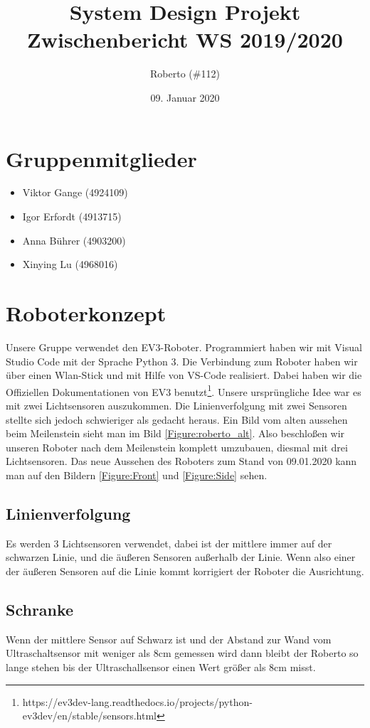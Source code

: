 \documentclass[11pt]{article}
\title{
  \Huge System Design Projekt \\
  \LARGE Zwischenbericht WS 2019/2020
}
\author{ \Large Roberto (\#112)\\ }
\date{ 09. Januar 2020 }
\begin{document}
\maketitle  %

\section{Gruppenmitglieder}
\begin{itemize}
  \item Viktor Gange (4924109)
  \item Igor Erfordt (4913715)
  \item Anna Bührer (4903200)
  \item Xinying Lu (4968016)
\end{itemize}

\section{Roboterkonzept}
Unsere Gruppe verwendet den EV3-Roboter. Programmiert haben wir mit Visual Studio Code mit der Sprache Python 3. Die Verbindung zum Roboter haben wir über einen Wlan-Stick und mit Hilfe von VS-Code realisiert. Dabei haben wir die Offiziellen Dokumentationen von EV3 benutzt\footnote{https://ev3dev-lang.readthedocs.io/projects/python-ev3dev/en/stable/sensors.html}. Unsere ursprüngliche Idee war es mit zwei Lichtsensoren auszukommen. Die Linienverfolgung mit zwei Sensoren stellte sich jedoch schwieriger als gedacht heraus. Ein Bild vom alten aussehen beim Meilenstein sieht man im Bild \ref{Figure:roberto_alt}. Also beschloßen wir unseren Roboter nach dem Meilenstein komplett umzubauen, diesmal mit drei Lichtsensoren. Das neue Aussehen des Roboters zum Stand von 09.01.2020 kann man auf den Bildern \ref{Figure:Front} und \ref{Figure:Side} sehen.

\subsection{Linienverfolgung}
Es werden 3 Lichtsensoren verwendet, dabei ist der mittlere immer auf der schwarzen Linie, und die äußeren Sensoren außerhalb der Linie. Wenn also einer der äußeren Sensoren auf die Linie kommt korrigiert der Roboter die Ausrichtung.

\subsection{Schranke}
Wenn der mittlere Sensor auf Schwarz ist und der Abstand zur Wand vom Ultraschaltsensor mit weniger als 8cm gemessen wird dann bleibt der Roberto so lange stehen bis der Ultraschallsensor einen Wert größer als 8cm misst.
\end{document}
